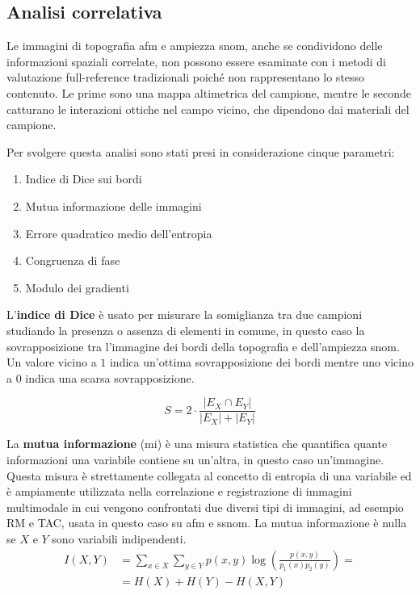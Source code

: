 \documentclass[../main.tex]{subfiles}
\begin{document}
\subsection{Analisi correlativa}

Le immagini di topografia \acrshort{afm} e ampiezza \acrshort{snom}, anche se condividono delle informazioni spaziali correlate, non possono essere esaminate con i metodi di valutazione full-reference tradizionali poiché non rappresentano lo stesso contenuto. Le prime sono una mappa altimetrica del campione, mentre le seconde catturano le interazioni ottiche nel campo vicino, che dipendono dai materiali del campione.

Per svolgere questa analisi sono stati presi in considerazione cinque parametri:

\begin{enumerate}
	\itemsep0em
	\item Indice di Dice sui bordi
	\item Mutua informazione delle immagini
	\item Errore quadratico medio dell'entropia
	\item Congruenza di fase
	\item Modulo dei gradienti
\end{enumerate}

L'\textbf{indice di Dice} è usato per misurare la somiglianza tra due campioni studiando la presenza o assenza di elementi in comune, in questo caso la sovrapposizione tra l'immagine dei bordi della topografia e dell'ampiezza \acrshort{snom}. Un valore vicino a $1$ indica un'ottima sovrapposizione dei bordi mentre uno vicino a $0$ indica una scarsa sovrapposizione.\cite{carass_2020}

\begin{equation}
	S = 2\cdot \frac{\left|E_{X} \cap  E_{Y}\right|}{\left|E_{X}\right| + \left|E_{Y}\right|}
\end{equation}

La \textbf{mutua informazione} (\acrshort{mi}) è una misura statistica che quantifica quante informazioni una variabile contiene su un'altra, in questo caso un'immagine.\cite{shannon_1948} Questa misura è strettamente collegata al concetto di entropia di una variabile ed è ampiamente utilizzata nella correlazione e registrazione di immagini multimodale in cui vengono confrontati due diversi tipi di immagini,\cite{viola_1997} ad esempio RM e TAC,\cite{mclaughlin_2004, veninga_2004} usata in questo caso su \acrshort{afm} e \acrshort{ssnom}. La mutua informazione è nulla se $X$ e $Y$ sono variabili indipendenti.
\begin{equation}
	\begin{aligned}
		I(X,Y)  &= \sum_{x\in X}\sum_{y\in Y} p(x,y) \log\left(\frac{p(x,y)}{p_1(x)p_2(y)}\right) =\\
		&= H(X) + H(Y) - H(X,Y)
	\end{aligned}
\end{equation}
\end{document}
